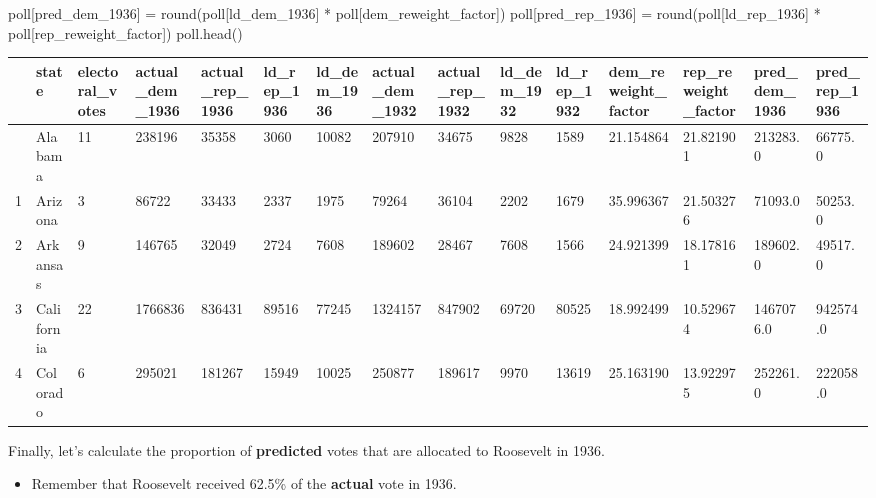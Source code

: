 \documentclass[
  letterpaper,
  DIV=11,
  numbers=noendperiod]{scrreprt}
\newenvironment{Shaded}{\begin{snugshade}}{\end{snugshade}}
\newcommand{\BuiltInTok}[1]{\textcolor[rgb]{0.00,0.23,0.31}{#1}}
\newcommand{\NormalTok}[1]{\textcolor[rgb]{0.00,0.23,0.31}{#1}}
\newcommand{\OperatorTok}[1]{\textcolor[rgb]{0.37,0.37,0.37}{#1}}
\newcommand{\StringTok}[1]{\textcolor[rgb]{0.13,0.47,0.30}{#1}}
\providecommand{\tightlist}{%
  \setlength{\itemsep}{0pt}\setlength{\parskip}{0pt}}\usepackage{longtable,booktabs,array}
\begin{document}
\begin{Shaded}
\begin{Highlighting}[]
\NormalTok{poll[}\StringTok{\textquotesingle{}pred\_dem\_1936\textquotesingle{}}\NormalTok{] }\OperatorTok{=} \BuiltInTok{round}\NormalTok{(poll[}\StringTok{\textquotesingle{}ld\_dem\_1936\textquotesingle{}}\NormalTok{] }\OperatorTok{*}\NormalTok{ poll[}\StringTok{\textquotesingle{}dem\_reweight\_factor\textquotesingle{}}\NormalTok{])}
\NormalTok{poll[}\StringTok{\textquotesingle{}pred\_rep\_1936\textquotesingle{}}\NormalTok{] }\OperatorTok{=} \BuiltInTok{round}\NormalTok{(poll[}\StringTok{\textquotesingle{}ld\_rep\_1936\textquotesingle{}}\NormalTok{] }\OperatorTok{*}\NormalTok{ poll[}\StringTok{\textquotesingle{}rep\_reweight\_factor\textquotesingle{}}\NormalTok{])}
\NormalTok{poll.head()}
\end{Highlighting}
\end{Shaded}

\begin{longtable}[]{@{}lllllllllllllll@{}}
\toprule\noalign{}
& state & electoral\_votes & actual\_dem\_1936 & actual\_rep\_1936 &
ld\_rep\_1936 & ld\_dem\_1936 & actual\_dem\_1932 & actual\_rep\_1932 &
ld\_dem\_1932 & ld\_rep\_1932 & dem\_reweight\_factor &
rep\_reweight\_factor & pred\_dem\_1936 & pred\_rep\_1936 \\
\midrule\noalign{}
\endhead
\bottomrule\noalign{}
\endlastfoot
0 & Alabama & 11 & 238196 & 35358 & 3060 & 10082 & 207910 & 34675 & 9828
& 1589 & 21.154864 & 21.821901 & 213283.0 & 66775.0 \\
1 & Arizona & 3 & 86722 & 33433 & 2337 & 1975 & 79264 & 36104 & 2202 &
1679 & 35.996367 & 21.503276 & 71093.0 & 50253.0 \\
2 & Arkansas & 9 & 146765 & 32049 & 2724 & 7608 & 189602 & 28467 & 7608
& 1566 & 24.921399 & 18.178161 & 189602.0 & 49517.0 \\
3 & California & 22 & 1766836 & 836431 & 89516 & 77245 & 1324157 &
847902 & 69720 & 80525 & 18.992499 & 10.529674 & 1467076.0 & 942574.0 \\
4 & Colorado & 6 & 295021 & 181267 & 15949 & 10025 & 250877 & 189617 &
9970 & 13619 & 25.163190 & 13.922975 & 252261.0 & 222058.0 \\
\end{longtable}

Finally, let's calculate the proportion of \textbf{predicted} votes that
are allocated to Roosevelt in 1936.

\begin{itemize}
\tightlist
\item
  Remember that Roosevelt received 62.5\% of the \textbf{actual} vote in
  1936.
\end{itemize}
\end{document}
